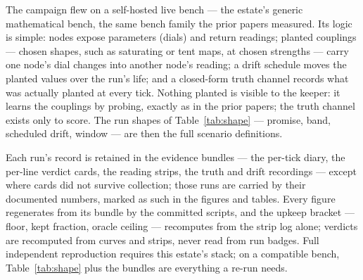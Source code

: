 \documentclass[11pt,a4paper]{article}
\begin{document}
The campaign flew on a self-hosted live bench --- the estate's
generic mathematical bench, the same bench family the prior papers
measured. Its logic is simple: nodes expose parameters (dials) and
return readings; planted couplings --- chosen shapes, such as
saturating or tent maps, at chosen strengths --- carry one node's
dial changes into another node's reading; a drift schedule moves the
planted values over the run's life; and a closed-form truth channel
records what was actually planted at every tick. Nothing planted is
visible to the keeper: it learns the couplings by probing, exactly
as in the prior papers; the truth channel exists only to score. The
run shapes of Table~\ref{tab:shape} ---
promise, band, scheduled drift, window --- are then the full
scenario definitions.

Each run's record is retained
in the evidence bundles --- the per-tick diary, the per-line verdict
cards, the reading strips, the truth and drift recordings --- except
where cards did not survive collection; those runs are carried by
their documented numbers, marked as such in the figures and tables. Every
figure regenerates from its bundle by the committed scripts, and the
upkeep bracket --- floor, kept fraction, oracle ceiling --- recomputes
from the strip log alone; verdicts are recomputed from curves and
strips, never read from run badges. Full independent reproduction
requires this estate's stack; on a compatible bench,
Table~\ref{tab:shape} plus the bundles are everything a re-run needs.
\end{document}
